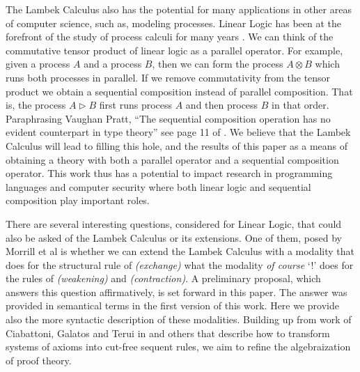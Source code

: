 \documentclass{llncs}
\newcommand{\Lnt}[1]{\mathit{#1}}
\begin{document}
The Lambek Calculus also has the potential for many applications in
other areas of computer science, such as, modeling processes.  Linear
Logic has been at the forefront of the study of process calculi for
many years \cite{HONDA20102223,Pratt:1997,ABRAMSKY19945}. We can think
of the commutative tensor product of linear logic as a parallel
operator.  For example, given a process $\Lnt{A}$ and a process $\Lnt{B}$,
then we can form the process $ \Lnt{A}  \otimes  \Lnt{B} $ which runs both processes
in parallel.  If we remove commutativity from the tensor product we
obtain a sequential composition instead of parallel composition.  That
is, the process $\Lnt{A} \rhd \Lnt{B}$ first runs process $\Lnt{A}$ and then
process $\Lnt{B}$ in that order.  Paraphrasing Vaughan Pratt, ``The
sequential composition operation has no evident counterpart in type
theory'' see page 11 of \cite{Pratt:1997}.  We believe that the Lambek
Calculus will lead to filling this hole, and the results of this paper
as a means of obtaining a theory with both a parallel operator and a
sequential composition operator.  This work thus has a potential to
impact research in programming languages and computer security where
both linear logic and sequential composition play important roles.

There are several interesting questions, considered for Linear Logic,
that could also be asked of the Lambek Calculus or its extensions.
One of them, posed by Morrill et al is whether we can extend the
Lambek Calculus with a modality that does for the structural rule of
\textit{(exchange)} what the modality \textit{of course} `!' does for
the rules of \textit{(weakening)} and \textit{(contraction)}.  A
preliminary proposal, which answers this question affirmatively, is
set forward in this paper. The answer was provided in semantical terms
in the first version of this work. Here we provide also the more
syntactic description of these modalities. Building up from work of
Ciabattoni, Galatos and Terui in \cite{Ciabattoni2012} and others that
describe how to transform systems of axioms into cut-free sequent
rules, we aim to refine the algebraization of proof theory.

\end{document}
